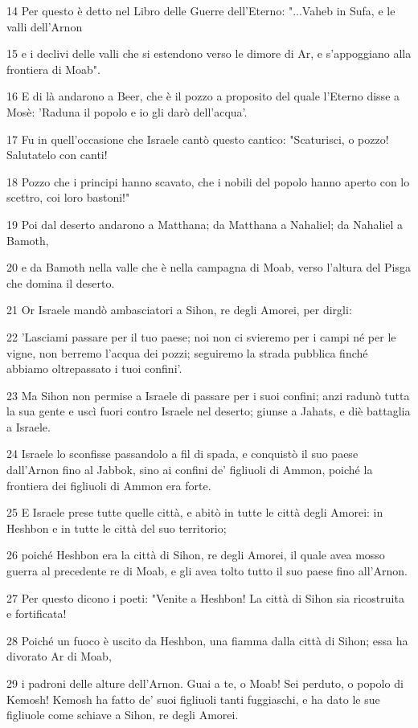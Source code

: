 \par 14 Per questo è detto nel Libro delle Guerre dell'Eterno: "...Vaheb in Sufa, e le valli dell'Arnon
\par 15 e i declivi delle valli che si estendono verso le dimore di Ar, e s'appoggiano alla frontiera di Moab".
\par 16 E di là andarono a Beer, che è il pozzo a proposito del quale l'Eterno disse a Mosè: 'Raduna il popolo e io gli darò dell'acqua'.
\par 17 Fu in quell'occasione che Israele cantò questo cantico: "Scaturisci, o pozzo! Salutatelo con canti!
\par 18 Pozzo che i principi hanno scavato, che i nobili del popolo hanno aperto con lo scettro, coi loro bastoni!"
\par 19 Poi dal deserto andarono a Matthana; da Matthana a Nahaliel; da Nahaliel a Bamoth,
\par 20 e da Bamoth nella valle che è nella campagna di Moab, verso l'altura del Pisga che domina il deserto.
\par 21 Or Israele mandò ambasciatori a Sihon, re degli Amorei, per dirgli:
\par 22 'Lasciami passare per il tuo paese; noi non ci svieremo per i campi né per le vigne, non berremo l'acqua dei pozzi; seguiremo la strada pubblica finché abbiamo oltrepassato i tuoi confini'.
\par 23 Ma Sihon non permise a Israele di passare per i suoi confini; anzi radunò tutta la sua gente e uscì fuori contro Israele nel deserto; giunse a Jahats, e diè battaglia a Israele.
\par 24 Israele lo sconfisse passandolo a fil di spada, e conquistò il suo paese dall'Arnon fino al Jabbok, sino ai confini de' figliuoli di Ammon, poiché la frontiera dei figliuoli di Ammon era forte.
\par 25 E Israele prese tutte quelle città, e abitò in tutte le città degli Amorei: in Heshbon e in tutte le città del suo territorio;
\par 26 poiché Heshbon era la città di Sihon, re degli Amorei, il quale avea mosso guerra al precedente re di Moab, e gli avea tolto tutto il suo paese fino all'Arnon.
\par 27 Per questo dicono i poeti: "Venite a Heshbon! La città di Sihon sia ricostruita e fortificata!
\par 28 Poiché un fuoco è uscito da Heshbon, una fiamma dalla città di Sihon; essa ha divorato Ar di Moab,
\par 29 i padroni delle alture dell'Arnon. Guai a te, o Moab! Sei perduto, o popolo di Kemosh! Kemosh ha fatto de' suoi figliuoli tanti fuggiaschi, e ha dato le sue figliuole come schiave a Sihon, re degli Amorei.
